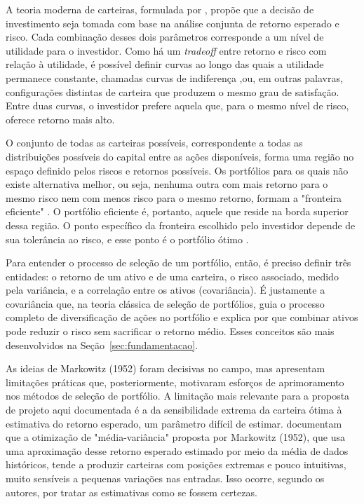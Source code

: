 \documentclass[12pt,a4paper]{article}
\begin{document}
A teoria moderna de carteiras, formulada por , propõe que a decisão de investimento seja tomada com base na análise conjunta de retorno esperado e risco. Cada combinação desses dois parâmetros corresponde a um nível de utilidade para o investidor. Como há um \textit{tradeoff} entre retorno e risco com relação à utilidade, é possível definir curvas ao longo das quais a utilidade permanece constante, chamadas curvas de indiferença ,ou, em outras palavras, configurações distintas de carteira que produzem o mesmo grau de satisfação. Entre duas curvas, o investidor prefere aquela que, para o mesmo nível de risco, oferece retorno mais alto.

O conjunto de todas as carteiras possíveis, correspondente a todas as distribuições possíveis do capital entre as ações disponíveis, forma uma região no espaço definido pelos riscos e retornos possíveis. Os portfólios para os quais não existe alternativa melhor, ou seja, nenhuma outra com mais retorno para o mesmo risco nem com menos risco para o mesmo retorno, formam a "fronteira eficiente" \cite{markowitz1952portfolio}. O portfólio eficiente é, portanto, aquele que reside na borda superior dessa região. O ponto específico da fronteira escolhido pelo investidor depende de sua tolerância ao risco, e esse ponto é o portfólio ótimo \cite{markowitz1952portfolio}.

Para entender o processo de seleção de um portfólio, então, é preciso definir três entidades: o retorno de um ativo e de uma carteira, o risco associado, medido pela variância, e a correlação entre os ativos (covariância). É justamente a covariância que, na teoria clássica de seleção de portfólios, guia o processo completo de diversificação de ações no portfólio e explica por que combinar ativos pode reduzir o risco sem sacrificar o retorno médio. Esses conceitos são mais desenvolvidos na Seção~\ref{sec:fundamentacao}.

As ideias de Markowitz (1952) foram decisivas no campo, mas apresentam limitações práticas que, posteriormente, motivaram esforços de aprimoramento nos métodos de seleção de portfólio. A limitação mais relevante para a proposta de projeto aqui documentada é a da sensibilidade extrema da carteira ótima à estimativa do retorno esperado, um parâmetro difícil de estimar.  documentam que a otimização de "média-variância" proposta por Markowitz (1952), que usa uma aproximação desse retorno esperado estimado por meio da média de dados históricos, tende a produzir carteiras com posições extremas e pouco intuitivas, muito sensíveis a pequenas variações nas entradas. Isso ocorre, segundo os autores, por tratar as estimativas como se fossem certezas.
\end{document}
